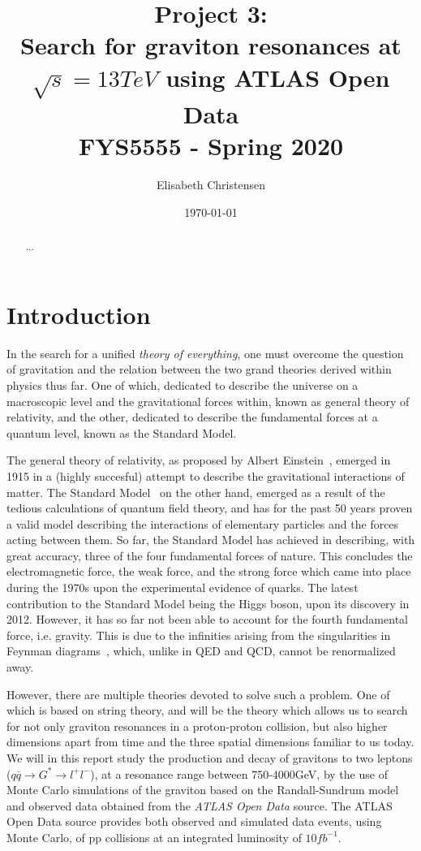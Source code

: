 \documentclass[12pt,a4paper]{amsart}
\title[OpenData dilepton analysis - graviton]{Project 3: \\ Search for graviton resonances at $\sqrt{s} = 13\si{TeV}$ using ATLAS Open Data\\
\small{\mdseries FYS5555 - Spring 2020}}
\date{\today}
\author[Christensen]{Elisabeth Christensen}
\begin{document}
\maketitle
\begin{abstract}
...
\end{abstract}

\section{Introduction}
In the search for a unified \textit{theory of everything}, one must overcome the question of gravitation and the relation between the two grand theories derived within physics thus far. One of which, dedicated to describe the universe on a macroscopic level and the gravitational forces within, known as general theory of relativity, and the other, dedicated to describe the fundamental forces at a quantum level, known as the Standard Model.

The general theory of relativity, as proposed by Albert Einstein~\cite{Einstein:1915}, emerged in 1915 in a (highly succesful) attempt to describe the gravitational interactions of matter. The Standard Model~\cite{Thomson:2019} on the other hand, emerged as a result of the tedious calculations of quantum field theory, and has for the past 50 years proven a valid model describing the interactions of elementary particles and the forces acting between them. So far, the Standard Model has achieved in describing, with great accuracy, three of the four fundamental forces of nature. This concludes the electromagnetic force, the weak force, and the strong force which came into place during the 1970s upon the experimental evidence of quarks. The latest contribution to the Standard Model being the Higgs boson, upon its discovery in 2012. However, it has so far not been able to account for the fourth fundamental force, i.e. gravity. This is due to the infinities arising from the singularities in Feynman diagrams~\cite{PhilosophyMeetsPhysics:2001}, which, unlike in QED and QCD, cannot be renormalized away.

However, there are multiple theories devoted to solve such a problem. One of which is based on string theory, and will be the theory which allows us to search for not only graviton resonances in a proton-proton collision, but also higher dimensions apart from time and the three spatial dimensions familiar to us today. We will in this report study the production and decay of gravitons to two leptons ($q\bar{q}\rightarrow G^* \rightarrow l^+l^-$), at a resonance range between 750-4000GeV, by the use of Monte Carlo simulations of the graviton based on the Randall-Sundrum model and observed data obtained from the \textit{ATLAS Open Data} source. The ATLAS Open Data source provides both observed and simulated data events, using Monte Carlo, of pp collisions at an integrated luminosity of $10\si{fb}^{-1}$.
\end{document}
